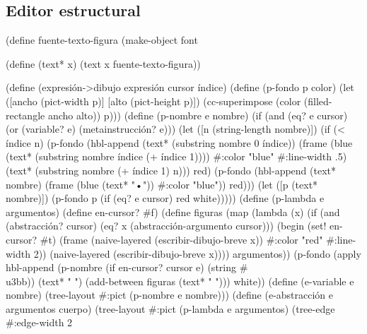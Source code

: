\documentclass[10pt,oneside,openany,letterpaper]{book}
\begin{document}
\subsection{Editor estructural}


\nwenddocs{}\endmoddef
(define fuente-texto-figura
  (make-object font%

(define (text* x)
  (text x fuente-texto-figura))

(define (expresión->dibujo expresión cursor índice)
  (define (p-fondo p color)
    (let ([ancho (pict-width p)]
          [alto  (pict-height p)])
      (cc-superimpose (color (filled-rectangle ancho alto)) p)))
  (define (p-nombre e nombre)
    (if (and (eq? e cursor) (or (variable? e) (metainstrucción? e)))
        (let ([n (string-length nombre)])
          (if (< índice n)
              (p-fondo (hbl-append (text* (substring nombre 0 índice))
                                   (frame (blue (text* (substring nombre índice (+ índice 1))))
                                          #:color "blue"
                                          #:line-width .5)
                                   (text* (substring nombre (+ índice 1) n)))
                       red)
              (p-fondo (hbl-append (text* nombre)
                                   (frame (blue (text* "•")) #:color "blue")) red)))
        (let ([p (text* nombre)])
          (p-fondo p (if (eq? e cursor) red white)))))
  (define (p-lambda e argumentos)
    (define en-cursor? #f)
    (define figuras (map (lambda (x)
                           (if (and (abstracción? cursor) (eq? x (abstracción-argumento cursor)))
                               (begin
                                 (set! en-cursor? #t)
                                 (frame (naive-layered (escribir-dibujo-breve x))
                                        #:color "red" #:line-width 2))
                               (naive-layered (escribir-dibujo-breve x))))
                         argumentos))
    (p-fondo (apply hbl-append (p-nombre (if en-cursor? cursor e) (string #\\u3bb)) (text* "  ")
                    (add-between figuras (text* "  ")))
             white))
  (define (e-variable e nombre)
    (tree-layout #:pict (p-nombre e nombre)))
  (define (e-abstracción e argumentos cuerpo)
    (tree-layout #:pict (p-lambda e argumentos)
                 (tree-edge #:edge-width 2
\end{document}
